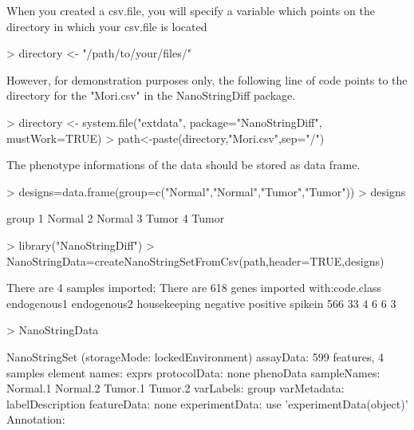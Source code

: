 \documentclass[12pt]{article}
\begin{document}
When you created a csv.file, you will specify a variable which 
points on the directory in which your csv.file is located

\begin{Schunk}
\begin{Sinput}
> directory <- "/path/to/your/files/"
\end{Sinput}
\end{Schunk}


However, for demonstration purposes only, the following line of 
code points to the directory for the "Mori.csv" in the 
NanoStringDiff package.

\begin{Schunk}
\begin{Sinput}
> directory <- system.file("extdata", package="NanoStringDiff", mustWork=TRUE)
> path<-paste(directory,"Mori.csv",sep="/")
\end{Sinput}
\end{Schunk}


The phenotype informations of the data should be stored as data frame.
\begin{Schunk}
\begin{Sinput}
> designs=data.frame(group=c("Normal","Normal","Tumor","Tumor"))
> designs
\end{Sinput}
\begin{Soutput}
   group
1 Normal
2 Normal
3  Tumor
4  Tumor
\end{Soutput}
\end{Schunk}


\begin{Schunk}
\begin{Sinput}
> library("NanoStringDiff")
> NanoStringData=createNanoStringSetFromCsv(path,header=TRUE,designs)
\end{Sinput}
\begin{Soutput}
 There are 4 samples imported; 
 There are  618 genes imported with:code.class
 endogenous1  endogenous2 housekeeping     negative     positive      spikein 
         566           33            4            6            6            3 
\end{Soutput}
\begin{Sinput}
> NanoStringData
\end{Sinput}
\begin{Soutput}
NanoStringSet (storageMode: lockedEnvironment)
assayData: 599 features, 4 samples 
  element names: exprs 
protocolData: none
phenoData
  sampleNames: Normal.1 Normal.2 Tumor.1 Tumor.2
  varLabels: group
  varMetadata: labelDescription
featureData: none
experimentData: use 'experimentData(object)'
Annotation:  
\end{Soutput}
\end{Schunk}
\end{document}
